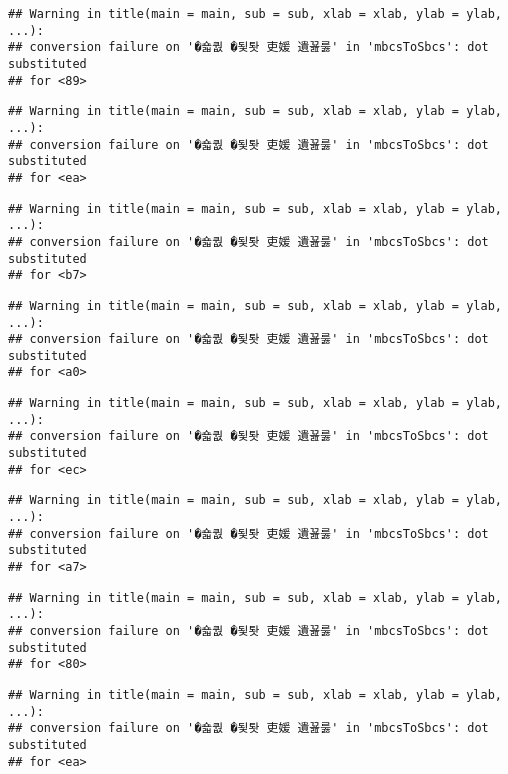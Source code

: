 \documentclass[]{article}
\begin{document}
\begin{verbatim}
## Warning in title(main = main, sub = sub, xlab = xlab, ylab = ylab, ...):
## conversion failure on '�숇퀎 �됯퇏 吏媛 遺꾪룷' in 'mbcsToSbcs': dot substituted
## for <89>
\end{verbatim}

\begin{verbatim}
## Warning in title(main = main, sub = sub, xlab = xlab, ylab = ylab, ...):
## conversion failure on '�숇퀎 �됯퇏 吏媛 遺꾪룷' in 'mbcsToSbcs': dot substituted
## for <ea>
\end{verbatim}

\begin{verbatim}
## Warning in title(main = main, sub = sub, xlab = xlab, ylab = ylab, ...):
## conversion failure on '�숇퀎 �됯퇏 吏媛 遺꾪룷' in 'mbcsToSbcs': dot substituted
## for <b7>
\end{verbatim}

\begin{verbatim}
## Warning in title(main = main, sub = sub, xlab = xlab, ylab = ylab, ...):
## conversion failure on '�숇퀎 �됯퇏 吏媛 遺꾪룷' in 'mbcsToSbcs': dot substituted
## for <a0>
\end{verbatim}

\begin{verbatim}
## Warning in title(main = main, sub = sub, xlab = xlab, ylab = ylab, ...):
## conversion failure on '�숇퀎 �됯퇏 吏媛 遺꾪룷' in 'mbcsToSbcs': dot substituted
## for <ec>
\end{verbatim}

\begin{verbatim}
## Warning in title(main = main, sub = sub, xlab = xlab, ylab = ylab, ...):
## conversion failure on '�숇퀎 �됯퇏 吏媛 遺꾪룷' in 'mbcsToSbcs': dot substituted
## for <a7>
\end{verbatim}

\begin{verbatim}
## Warning in title(main = main, sub = sub, xlab = xlab, ylab = ylab, ...):
## conversion failure on '�숇퀎 �됯퇏 吏媛 遺꾪룷' in 'mbcsToSbcs': dot substituted
## for <80>
\end{verbatim}

\begin{verbatim}
## Warning in title(main = main, sub = sub, xlab = xlab, ylab = ylab, ...):
## conversion failure on '�숇퀎 �됯퇏 吏媛 遺꾪룷' in 'mbcsToSbcs': dot substituted
## for <ea>
\end{verbatim}
\end{document}
